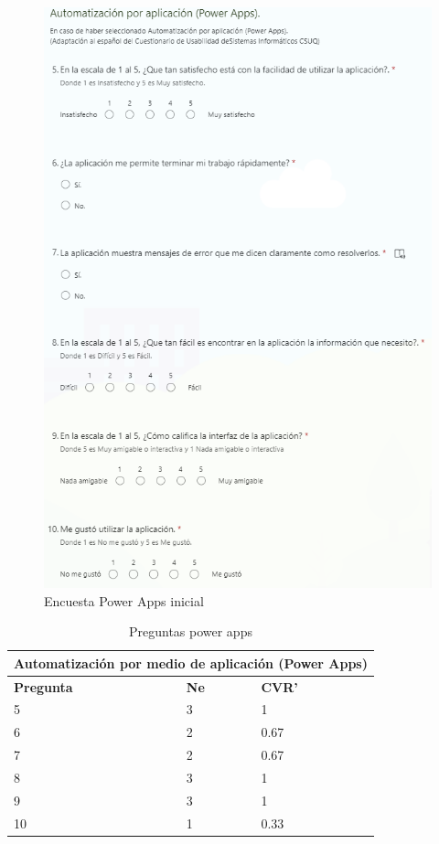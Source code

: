 \begin{figure}[H]
	\centering
	\includegraphics[scale=0.5]{Capitulo5/imagenes/fapps}
	\caption{Encuesta Power Apps inicial}
	\label{fig:eapps1}
\end{figure}


\begin{table}[H]
	\centering
	\begin{tabular}{|p{3cm}|p{3cm}|p{3cm} |}
		\hline
		\multicolumn{3}{|c|}{Automatización por medio de aplicación (Power Apps)} \\
		\hline
		\textbf{Pregunta}& \textbf{Ne}&\textbf{CVR'}\\
		\hline
		5&3&1\\
		\hline
		6&2&0.67\\
		\hline
		7&2&0.67\\
		\hline
		8&3&1\\
		\hline
		9&3&1\\
		\hline
		10&1&0.33\\
		\hline
		
	\end{tabular}
	\label{tabla:apps}
	\caption{Preguntas power apps}
\end{table}
